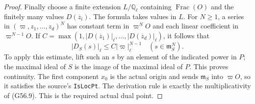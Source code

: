 \begin{proof}
Finally choose a finite extension $L/\mathbb Q_\ell$
containing $\operatorname{Frac}(O)$ and the finitely
many values $D(\overline z_i)$.
The formula takes values in $L$.
For $N\geq1$, a series in
$(\varpi,z_1,\ldots,z_d)^N$ has constant term
in $\varpi^N O$ and each linear coefficient in
$\varpi^{N-1}O$.
If $C=\max(1,|D(\overline z_1)|_\ell,\ldots,
|D(\overline z_d)|_\ell)$, it follows
that
\[
       |D_S(s)|_\ell\leq C|\varpi|_\ell^{N-1}
                \quad(s\in\mathfrak m_S^N).
                                                               \tag{G56.12}
\]
To apply this estimate, lift such an $s$ by an
element of the indicated power in $P$; the
maximal ideal of $S$ is the image of the
maximal ideal of $P$.  This proves continuity.
The first component $x_0$ is the actual origin
and sends $\mathfrak m_S$ into $\varpi O$, so
it satisfies the source's \texttt{IsLocPt}.
The derivation rule is exactly the multiplicativity
of (G56.9).  This is the required actual dual point.
\end{proof}

